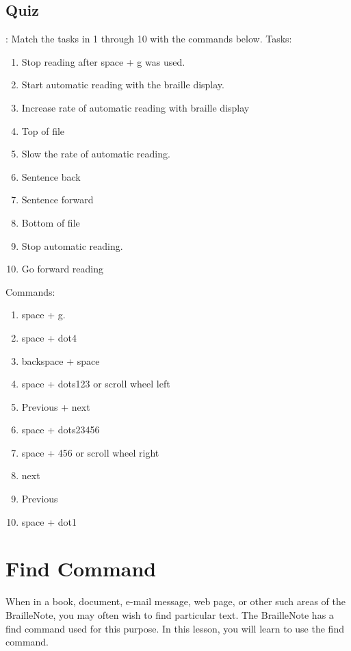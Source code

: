 \documentclass[10pt,letterpaper,twoside]{report}
\begin{document}
{\clearpage
\subsection{Quiz}:
Match the tasks in 1 through 10 with the commands below.
Tasks:
\begin{enumerate}
	\item Stop reading after space + g was used.
	\item Start automatic reading with the braille display.
	\item Increase rate of automatic reading with braille display
	\item Top of file
	\item Slow the rate of automatic reading.
	\item Sentence back
	\item Sentence forward
	\item Bottom of file
	\item Stop automatic reading.
	\item Go forward reading
\end{enumerate}
Commands:
\begin{enumerate}
	\item space + g.
	\item space + dot4
	\item backspace + space
	\item space + dots123 or scroll wheel left
	\item Previous + next
	\item space + dots23456
	\item space + 456 or scroll wheel right
	\item next
	\item Previous
	\item space + dot1
\end{enumerate}

\clearpage
\section{Find Command}
When in a book, document, e-mail message, web page, or other such areas of the BrailleNote, you may often wish to find particular text. The BrailleNote has a find command used for this purpose. In this lesson, you will learn to use the find command.
}
\end{document}
